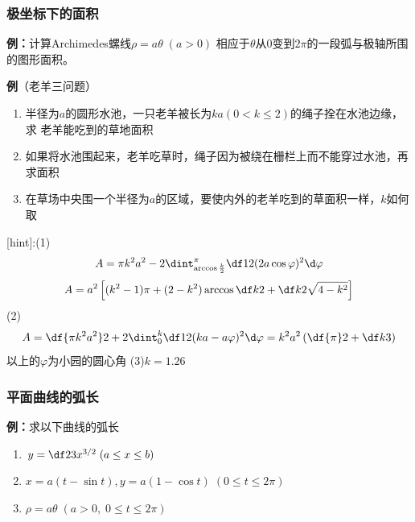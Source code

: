 \subsubsection{极坐标下的面积}

{\bf 例：}计算Archimedes螺线$\rho=a\theta\;(a>0)$
相应于$\theta$从$0$变到$2\pi$的一段弧与极轴所围的图形面积。

\begin{center}
\end{center}

{\bf 例}（老羊三问题）
\begin{enumerate}[(1)]
  \setlength{\itemindent}{1cm}
  \item 半径为$a$的圆形水池，一只老羊被长为$ka(0<k\leq2)$的绳子拴在水池边缘，求
  老羊能吃到的草地面积
  \item 如果将水池围起来，老羊吃草时，绳子因为被绕在栅栏上而不能穿过水池，再求面积
  \item 在草场中央围一个半径为$a$的区域，要使内外的老羊吃到的草面积一样，$k$如何取
\end{enumerate}

[hint]:(1)
$$A=\pi k^2a^2-2\dint_{\arccos\frac k2}^{\pi}\df12(2a\cos\varphi)^2
\d\varphi$$
$$A=a^2\left[(k^2-1)\pi+(2-k^2)\arccos\df k2+\df k2
\sqrt{4-k^2}\right]$$
(2)
$$A=\df{\pi k^2a^2}2+2\dint_0^k\df12(ka-a\varphi)^2\d\varphi=k^2a^2
\left(\df{\pi}2+\df k3\right)$$
以上的$\varphi$为小园的圆心角
(3)$k=1.26$

\subsubsection{平面曲线的弧长}

{\bf 例：}求以下曲线的弧长 
\begin{enumerate}[(1)]
  \setlength{\itemindent}{1cm}
  \item $y=\df 23x^{3/2}\;(a\leq x\leq b)$ 
  \item $x=a(t-\sin t),y=a(1-\cos t)\;(0\leq t\leq 2\pi)$ 
  \item $\rho=a\theta\;(a>0,\;0\leq t\leq 2\pi)$
\end{enumerate}

